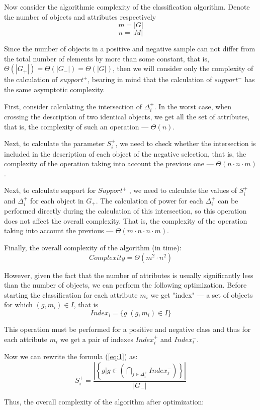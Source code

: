 \documentclass{article}
\begin{document}
\newpage
Now consider the algorithmic complexity of the classification algorithm. Denote the number of objects and attributes respectively
$$m = |G|$$
$$n = |M|$$

Since the number of objects in a positive and negative sample can not differ from the total number of elements by more than some constant, that is, $\Theta(|G_+|) = \Theta (|G_-|) = \Theta (|G|)$, then we will consider only the complexity of the calculation of $support^+$, bearing in mind that the calculation of $support^-$ has the same asymptotic complexity.

First, consider calculating the intersection of $\Delta^+_i$. In the worst case, when crossing the description of two identical objects, we get all the set of attributes, that is, the complexity of such an operation --- $\Theta(n)$.

Next, to calculate the parameter $S_i^+$, we need to check whether the intersection is included in the description of each object of the negative selection, that is, the complexity of the operation taking into account the previous one --- $\Theta(n \cdot n \cdot m)$.

Next, to calculate support for $Support^+$ , we need to calculate the values of $S_i^+$ and $\Delta_i^+$ for each object in $G_+$. The calculation of power for each $\Delta_i^+$ can be performed directly during the calculation of this intersection, so this operation does not affect the overall complexity. That is, the complexity of the operation taking into account the previous --- $\Theta (m \cdot n \cdot n \cdot m)$.

Finally, the overall complexity of the algorithm (in time):
$$Complexity = \Theta(m^2 \cdot n^2)$$

However, given the fact that the number of attributes is usually significantly less than the number of objects, we can perform the following optimization. Before starting the classification for each attribute $m_i$ we get "index" --- a set of objects for which $(g, m_i) \in I$, that is
$$Index_i = \{g| (g, m_i) \in I\}$$

This operation must be performed for a positive and negative class and thus for each attribute $m_i$ we get a pair of indexes $Index_i^+$ and $Index_i^-$.

Now we can rewrite the formula (\ref{eq:1}) as:
$$S_i^+ = \frac{\left\vert \left\{g|g \in \left(\bigcap_{j\in \Delta_i^+} Index_j^- \right) \right\} \right\vert}{|G_-|}$$

Thus, the overall complexity of the algorithm after optimization:
\end{document}
